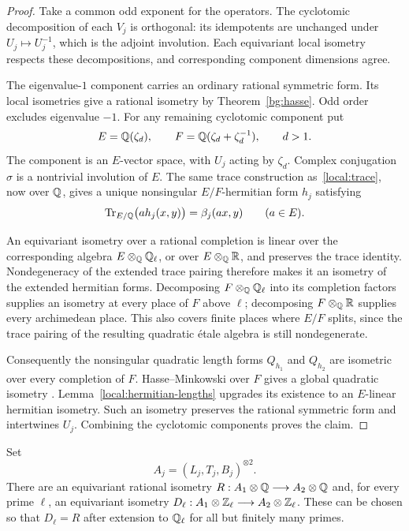 \begin{proof}
Take a common odd exponent for the operators.  The cyclotomic
decomposition of each $V_j$ is orthogonal: its idempotents are
unchanged under $U_j\mapsto U_j^{-1}$, which is the adjoint
involution.  Each equivariant local isometry respects these
decompositions, and corresponding component dimensions agree.

The eigenvalue-$1$ component carries an ordinary rational symmetric
form.  Its local isometries give a rational isometry by
Theorem~\ref{bg:hasse}.  Odd order excludes eigenvalue $-1$.
For any remaining cyclotomic component put
\[
 E=\mathbb Q(\zeta_d),\qquad F=\mathbb Q(\zeta_d+\zeta_d^{-1}),
 \qquad d>1.
\]
The component is an $E$-vector space, with $U_j$ acting by $\zeta_d$.
Complex conjugation $\sigma$ is a nontrivial involution of $E$.
The same trace construction as~\eqref{local:trace}, now over $\mathbb Q$,
gives a unique nonsingular $E/F$-hermitian form $h_j$ satisfying
\[
 \operatorname{Tr}_{E/\mathbb Q}\bigl(a h_j(x,y)\bigr)
      =\beta_j(ax,y)\qquad(a\in E).
\]

An equivariant isometry over a rational completion is linear over
the corresponding algebra $E\otimes_\mathbb Q\mathbb Q_\ell$, or over
$E\otimes_\mathbb Q\mathbb R$, and preserves the trace identity.  Nondegeneracy
of the extended trace pairing therefore makes it an isometry of
the extended hermitian forms.  Decomposing
$F\otimes_\mathbb Q\mathbb Q_\ell$ into its completion factors supplies an
isometry at every place of $F$ above $\ell$; decomposing
$F\otimes_\mathbb Q\mathbb R$ supplies every archimedean place.  This also
covers finite places where $E/F$ splits, since the trace pairing of
the resulting quadratic \'etale algebra is still nondegenerate.

Consequently the nonsingular quadratic length forms $Q_{h_1}$ and
$Q_{h_2}$ are isometric over every completion of $F$.  Hasse--Minkowski
over $F$ gives a global quadratic isometry
\cite[Theorem~25.64(c)]{Milne2022}.  Lemma~\ref{local:hermitian-lengths} upgrades its
existence to an $E$-linear hermitian isometry.  Such an isometry
preserves the rational symmetric form and intertwines $U_j$.
Combining the cyclotomic components proves the claim.
\end{proof}

\begin{proposition}
\label{local:rational}\label{local:conclusion}
Set
\[
 A_j=(L_j,T_j,B_j)^{\otimes2}.
\]
There are an equivariant rational isometry
$R:A_1\otimes\mathbb Q\longrightarrow A_2\otimes\mathbb Q$ and, for every prime
$\ell$, an equivariant isometry
$D_\ell:A_1\otimes\mathbb Z_\ell\longrightarrow A_2\otimes\mathbb Z_\ell$.
These can be chosen so that $D_\ell=R$ after extension to $\mathbb Q_\ell$
for all but finitely many primes.
\end{proposition}

